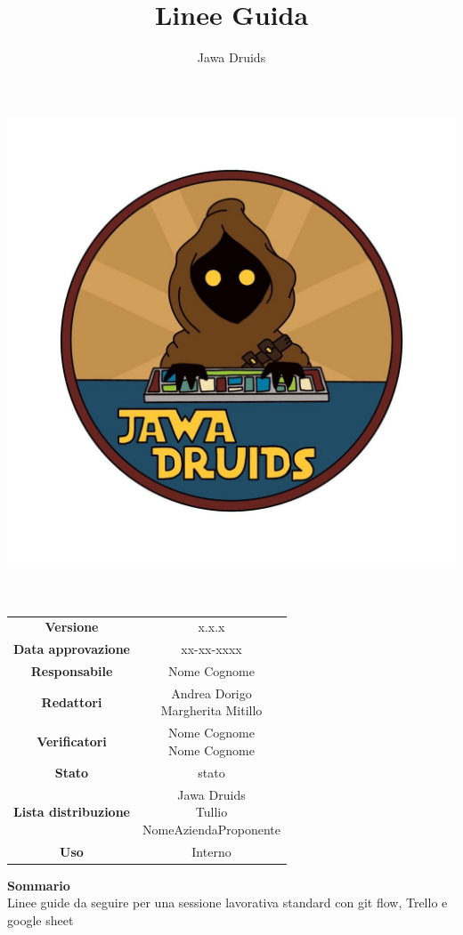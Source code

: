 \documentclass[a4paper,12pt]{report}
\begin{document}
    
\makeatletter
\begin{titlepage}
    \begin{center}
    \vspace*{-4,0cm}
    \author{Jawa Druids} 
    \title{Linee Guida}
    \date{} %
    \includegraphics[width=0.7\linewidth]{../immagini/DRUIDSLOGO.jpg}\\[4ex]
    {\huge \bfseries  \@title }\\[2ex] 
    {\LARGE  \@author}\\[50ex]
    \vspace*{-8,0cm}
    \begin{table}[H]
        \centering
        \begin{tabular}{c|c}
            \textbf{Versione} & x.x.x \\
            \textbf{Data approvazione} & xx-xx-xxxx\\
            \textbf{Responsabile} & Nome Cognome\\
            \textbf{Redattori} & \makecell{Andrea Dorigo \\ Margherita Mitillo} \\
            \textbf{Verificatori} & \makecell{Nome Cognome \\ Nome Cognome} \\
            \textbf{Stato} & stato\\
            \textbf{Lista distribuzione} & \makecell{Jawa Druids \\ Tullio \\ NomeAziendaProponente}\\
            \textbf{Uso} & Interno            
        \end{tabular}
    \end{table}
	\hfill \break
    \fontsize{16}{10}\textbf{Sommario} \\
    Linee guide da seguire per una sessione lavorativa standard con git flow, Trello e google sheet
    \end{center}
\end{titlepage}
\makeatother

\tableofcontents{}

\end{document}
